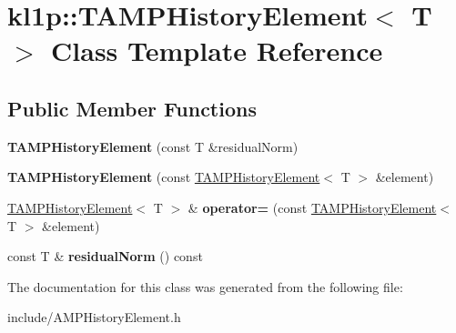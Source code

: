 \hypertarget{classkl1p_1_1TAMPHistoryElement}{}\section{kl1p\+:\+:T\+A\+M\+P\+History\+Element$<$ T $>$ Class Template Reference}
\label{classkl1p_1_1TAMPHistoryElement}
\subsection*{Public Member Functions}
\begin{DoxyCompactItemize}
\item 
{\bfseries T\+A\+M\+P\+History\+Element} (const T \&residual\+Norm)\hypertarget{classkl1p_1_1TAMPHistoryElement_ab82bfe2b9f73b9277839340ceaad4368}{}\label{classkl1p_1_1TAMPHistoryElement_ab82bfe2b9f73b9277839340ceaad4368}

\item 
{\bfseries T\+A\+M\+P\+History\+Element} (const \hyperlink{classkl1p_1_1TAMPHistoryElement}{T\+A\+M\+P\+History\+Element}$<$ T $>$ \&element)\hypertarget{classkl1p_1_1TAMPHistoryElement_aff2cad4a3376842692fbc80903578615}{}\label{classkl1p_1_1TAMPHistoryElement_aff2cad4a3376842692fbc80903578615}

\item 
\hyperlink{classkl1p_1_1TAMPHistoryElement}{T\+A\+M\+P\+History\+Element}$<$ T $>$ \& {\bfseries operator=} (const \hyperlink{classkl1p_1_1TAMPHistoryElement}{T\+A\+M\+P\+History\+Element}$<$ T $>$ \&element)\hypertarget{classkl1p_1_1TAMPHistoryElement_ab000e1b3add93053e3d046564dc0a53c}{}\label{classkl1p_1_1TAMPHistoryElement_ab000e1b3add93053e3d046564dc0a53c}

\item 
const T \& {\bfseries residual\+Norm} () const \hypertarget{classkl1p_1_1TAMPHistoryElement_abafcf905c37abbe1f0c30d15e409b91a}{}\label{classkl1p_1_1TAMPHistoryElement_abafcf905c37abbe1f0c30d15e409b91a}

\end{DoxyCompactItemize}


The documentation for this class was generated from the following file\+:\begin{DoxyCompactItemize}
\item 
include/A\+M\+P\+History\+Element.\+h\end{DoxyCompactItemize}

